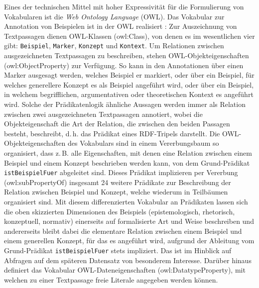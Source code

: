\documentclass{article}
\newcommand*{\vokabular}{\texttt}%
\newcommand*{\englisch}[1]{\foreignlanguage{english}{\textit{#1}}}%
\begin{document}
Eines der technischen Mittel mit hoher Expressivität für die
Formulierung von Vokabularen ist die \englisch{Web Ontology Language}
(OWL). Das Vokabular zur Annotation von Beispielen ist in der OWL
realisiert \parencite{CL2018a}: Zur Auszeichnung von Textpassagen
dienen OWL-Klassen (owl:Class), von denen es im wesentlichen vier
gibt: \vokabular{Beispiel}, \vokabular{Marker}, \vokabular{Konzept}
und \vokabular{Kontext}. Um Relationen zwischen ausgezeichneten
Textpassagen zu beschreiben, stehen OWL-Objekteigenschaften
(owl:ObjectProperty) zur Verfügung. So kann in den Annotationen über
einen Marker ausgesagt werden, welches Beispiel er markiert, oder über
ein Beispiel, für welches generellere Konzept es als Beispiel
angeführt wird, oder über ein Beispiel, in welchem begrifflichen,
argumentativen oder theoretischen Kontext es angeführt wird. Solche
der Prädikatenlogik ähnliche Aussagen werden immer als Relation
zwischen zwei ausgezeichneten Textpassagen annotiert, wobei die
Objekteigenschaft die Art der Relation, die zwischen den beiden
Passagen besteht, beschreibt, d.\,h. das Prädikat eines RDF-Tripels
darstellt. Die OWL-Objekteigenschaften des Vokabulars sind in einem
Vererbungsbaum so organisiert, dass z.\,B. alle Eigenschaften, mit
denen eine Relation zwischen einem Beispiel und einem Konzept
beschrieben werden kann, von dem Grund-Prädikat
\vokabular{istBeispielFuer} abgeleitet sind. Dieses Prädikat
implizieren per Vererbung (owl:subPropertyOf) insgesamt 24 weitere
Prädikate zur Beschreibung der Relation zwischen Beispiel und Konzept,
welche wiederum in Teilbäumen organisiert sind. Mit diesem
differenzierten Vokabular an Prädikaten lassen sich die oben
skizzierten Dimensionen des Beispiels (epistemologisch, rhetorisch,
konzeptuell, normativ) einerseits auf formalisierte Art und Weise
beschreiben und andererseits bleibt dabei die elementare Relation
zwischen einem Beispiel und einem generellen Konzept, für das es
angeführt wird, aufgrund der Ableitung vom Grund-Prädikat
\vokabular{istBeispielFuer} stets impliziert. Das ist im Hinblick auf
Abfragen auf dem späteren Datensatz von besonderem Interesse. Darüber
hinaus definiert das Vokabular OWL-Dateneigenschaften
(owl:DatatypeProperty), mit welchen zu einer Textpassage freie
Literale angegeben werden können.
\end{document}
